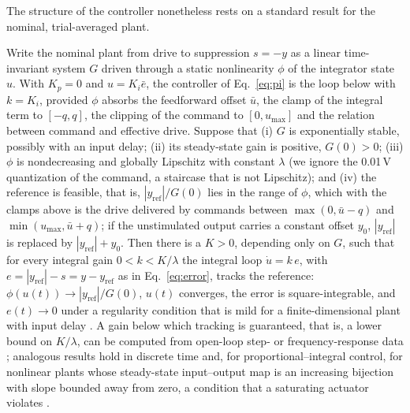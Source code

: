 
The structure of the controller nonetheless rests on a standard result for the nominal, trial-averaged plant.

\begin{rem}
\label{rem:lowgain}
Write the nominal plant from drive to suppression $s = -y$ as a linear time-invariant system $G$ driven through a static nonlinearity $\phi$ of the integrator state $u$. With $K_p = 0$ and $u = K_i\bar e$, the controller of Eq.~\eqref{eq:pi} is the loop below with $k = K_i$, provided $\phi$ absorbs the feedforward offset $\bar u$, the clamp of the integral term to $[-q, q]$, the clipping of the command to $[0, u_{\max}]$ and the relation between command and effective drive. Suppose that (i) $G$ is exponentially stable, possibly with an input delay; (ii) its steady-state gain is positive, $G(0) > 0$; (iii) $\phi$ is nondecreasing and globally Lipschitz with constant $\lambda$ (we ignore the 0.01\,V quantization of the command, a staircase that is not Lipschitz); and (iv) the reference is feasible, that is, $|y_{\mathrm{ref}}|/G(0)$ lies in the range of $\phi$, which with the clamps above is the drive delivered by commands between $\max(0, \bar u - q)$ and $\min(u_{\max}, \bar u + q)$; if the unstimulated output carries a constant offset $y_0$, $|y_{\mathrm{ref}}|$ is replaced by $|y_{\mathrm{ref}}| + y_0$. Then there is a $K > 0$, depending only on $G$, such that for every integral gain $0 < k < K/\lambda$ the integral loop $\dot{u} = k\,e$, with $e = |y_{\mathrm{ref}}| - s = y - y_{\mathrm{ref}}$ as in Eq.~\eqref{eq:error}, tracks the reference: $\phi(u(t)) \to |y_{\mathrm{ref}}|/G(0)$, $u(t)$ converges, the error is square-integrable, and $e(t) \to 0$ under a regularity condition that is mild for a finite-dimensional plant with input delay \citep[Theorem~4.1(a),(c),(d),(f) and Remark~4.2(b)]{logemann2000absolute}. A gain below which tracking is guaranteed, that is, a lower bound on $K/\lambda$, can be computed from open-loop step- or frequency-response data \citep{logemann1999integral}; analogous results hold in discrete time \citep{fliegner2001discrete} and, for proportional--integral control, for nonlinear plants whose steady-state input--output map is an increasing bijection with slope bounded away from zero, a condition that a saturating actuator violates \citep{desoer1985tracking}.
\end{rem}


